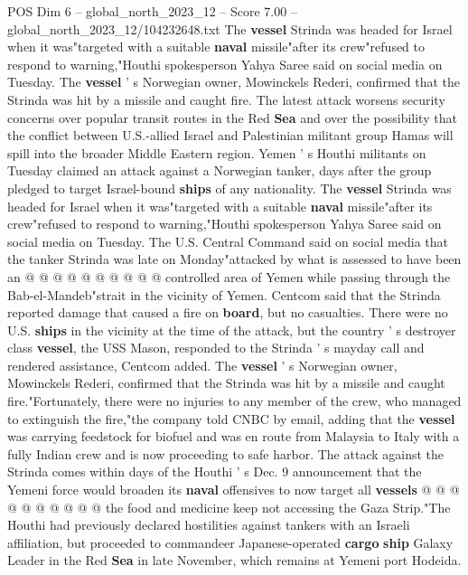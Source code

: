 \begin{textsample}{POS Dim 6 – global\_north\_2023\_12 – Score 7.00 – global\_north\_2023\_12/104232648.txt}  \label{ex:f6_pos_189}
The \textbf{vessel} Strinda was headed for Israel when it was"targeted with a suitable \textbf{naval} missile"after its crew"refused to respond to warning,"Houthi spokesperson Yahya Saree said on social media on Tuesday.
The \textbf{vessel} ' s Norwegian owner, Mowinckels Rederi, confirmed that the Strinda was hit by a missile and caught fire.
The latest attack worsens security concerns over popular transit routes in the Red \textbf{Sea} and over the possibility that the conflict between U.S.-allied Israel and Palestinian militant group Hamas will spill into the broader Middle Eastern region.
Yemen ' s Houthi militants on Tuesday claimed an attack against a Norwegian tanker, days after the group pledged to target Israel-bound \textbf{ships} of any nationality.
The \textbf{vessel} Strinda was headed for Israel when it was"targeted with a suitable \textbf{naval} missile"after its crew"refused to respond to warning,"Houthi spokesperson Yahya Saree said on social media on Tuesday.
The U.S.
Central Command said on social media that the tanker Strinda was late on Monday"attacked by what is assessed to have been an @ @ @ @ @ @ @ @ @ @ controlled area of Yemen while passing through the Bab-el-Mandeb"strait in the vicinity of Yemen.
Centcom said that the Strinda reported damage that caused a fire on \textbf{board}, but no casualties.
There were no U.S. \textbf{ships} in the vicinity at the time of the attack, but the country ' s destroyer class \textbf{vessel}, the USS Mason, responded to the Strinda ' s mayday call and rendered assistance, Centcom added.
The \textbf{vessel} ' s Norwegian owner, Mowinckels Rederi, confirmed that the Strinda was hit by a missile and caught fire."Fortunately, there were no injuries to any member of the crew, who managed to extinguish the fire,"the company told CNBC by email, adding that the \textbf{vessel} was carrying feedstock for biofuel and was en route from Malaysia to Italy with a fully Indian crew and is now proceeding to safe harbor.
The attack against the Strinda comes within days of the Houthi ' s Dec. 9 announcement that the Yemeni force would broaden its \textbf{naval} offensives to now target all \textbf{vessels} @ @ @ @ @ @ @ @ @ @ the food and medicine keep not accessing the Gaza Strip."The Houthi had previously declared hostilities against tankers with an Israeli affiliation, but proceeded to commandeer Japanese-operated \textbf{cargo} \textbf{ship} Galaxy Leader in the Red \textbf{Sea} in late November, which remains at Yemeni port Hodeida.

\end{textsample}
